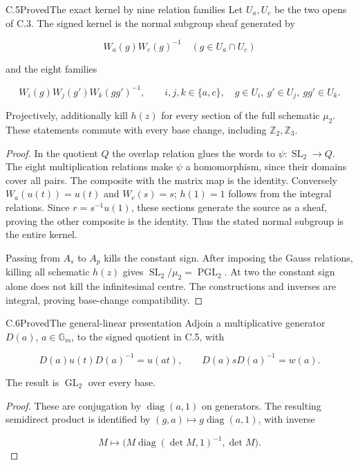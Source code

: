 \begin{statement}{C.5}{Proved}{The exact kernel by nine relation families}
Let $U_a,U_c$ be the two opens of C.3.
The signed kernel is the normal subgroup sheaf generated by

$$
W_a(g)W_c(g)^{-1}\quad(g\in U_a\cap U_c)
$$

and the eight families

$$
W_i(g)W_j(g')W_k(gg')^{-1},\qquad
 i,j,k\in\{a,c\},\quad g\in U_i,\ g'\in U_j,\ gg'\in U_k.
$$

Projectively, additionally kill $h(z)$ for every section of
the full schematic $\mu_2$. These statements commute with
every base change, including $\mathbb Z_2,\mathbb Z_3$.
\end{statement}
\begin{proof}
In the quotient $Q$ the overlap relation glues the words
to $\psi:\operatorname{SL}_2\to Q$.
The eight multiplication relations make $\psi$ a homomorphism,
since their domains cover all pairs.
The composite with the matrix map is the identity.
Conversely $W_a(u(t))=u(t)$ and $W_c(s)=s$;
$h(1)=1$ follows from the integral relations.
Since $r=s^{-1}u(1)$, these sections generate the source as
a sheaf, proving the other composite is the identity.
Thus the stated normal subgroup is the entire kernel.

Passing from $A_s$ to $A_p$ kills the constant sign.
After imposing the Gauss relations, killing all schematic
$h(z)$ gives $\operatorname{SL}_2/\mu_2=\operatorname{PGL}_2$.
At two the constant sign alone does not kill the infinitesimal
centre. The constructions and inverses are integral, proving
base-change compatibility.
\end{proof}

\begin{statement}{C.6}{Proved}{The general-linear presentation}
Adjoin a multiplicative generator $D(a)$, $a\in\mathbb G_m$,
to the signed quotient in C.5, with

$$
D(a)u(t)D(a)^{-1}=u(at),\qquad D(a)sD(a)^{-1}=w(a).
$$

The result is $\operatorname{GL}_2$ over every base.
\end{statement}
\begin{proof}
These are conjugation by $\operatorname{diag}(a,1)$ on
generators. The resulting semidirect product is identified
by $(g,a)\mapsto g\operatorname{diag}(a,1)$, with inverse

$$
M\longmapsto
 \bigl(M\operatorname{diag}(\det M,1)^{-1},\det M\bigr).
$$

\end{proof}

